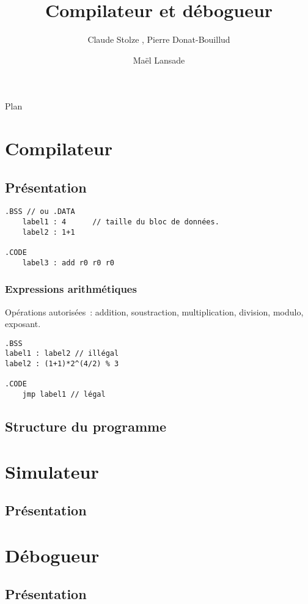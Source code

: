 \documentclass{beamer}
\title[Compilateur et débogueur] %
{Compilateur et débogueur}
\author[Claude Stolze, Pierre Donat-Bouillud, Maël Lansade]{Claude Stolze , Pierre Donat-Bouillud \and Maël Lansade}
\institute[ENS Cachan - Antenne de Bretagne]
\begin{document}
\begin{frame}
  \titlepage
\end{frame}

\begin{frame}{Plan}
  \tableofcontents
\end{frame}

\section{Compilateur}
\subsection{Présentation}
\begin{frame}[fragile]
\begin{verbatim}
.BSS // ou .DATA
	label1 : 4		// taille du bloc de données.
	label2 : 1+1

.CODE
	label3 : add r0 r0 r0
\end{verbatim}
\end{frame}

\begin{frame}[fragile]
\frametitle{Expressions arithmétiques}
Opérations autorisées~: addition, soustraction, multiplication, division, modulo, exposant.
\begin{verbatim}
.BSS
label1 : label2 // illégal
label2 : (1+1)*2^(4/2) % 3

.CODE
	jmp label1 // légal
\end{verbatim}
\end{frame}

\subsection{Structure du programme}
\begin{frame}


\end{frame}

\section{Simulateur}
\subsection{Présentation}

\section{Débogueur}
\subsection{Présentation}
\end{document}
